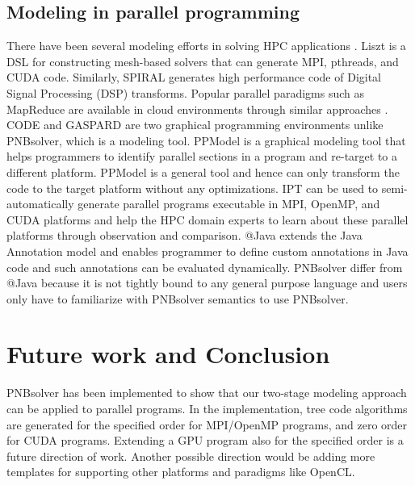 \documentclass[draftclsnofoot]{elsarticle}
\begin{document}
\subsection{Modeling in parallel programming}
There have been several modeling efforts in solving HPC applications \cite{rithu1,rithu2}. Liszt \cite{liszt} is a DSL for constructing mesh-based solvers that 
can generate MPI, pthreads, and CUDA code. Similarly, SPIRAL \cite{spiral} generates high performance code of Digital Signal Processing (DSP) transforms. 
Popular parallel paradigms such as MapReduce are available in cloud environments through similar approaches \cite{mapredoop}.
CODE \cite{code} and GASPARD \cite{gaspard} are two graphical programming environments unlike PNBsolver, which is a modeling tool. 
PPModel \cite{sc11,acmse} is a graphical modeling tool that helps programmers to identify parallel sections in a program and re-target to a different 
platform.  PPModel is a general tool and hence can only transform the code to the target platform without any optimizations.
IPT \cite{ipt} can be used to semi-automatically generate parallel programs executable in MPI, OpenMP, and CUDA platforms and help the HPC domain experts to learn about 
these parallel platforms through observation and comparison. @Java \cite{javaannotation} extends the Java Annotation model and enables programmer to define custom annotations in Java
code and such annotations can be evaluated dynamically. PNBsolver differ from @Java because it is not tightly bound to any general purpose language and users only have to familiarize with
PNBsolver semantics to use PNBsolver. 

\section{Future work and Conclusion}
\label{conclusion}

PNBsolver has been implemented to show that our two-stage modeling approach can be applied to parallel programs. In the implementation, tree code algorithms are generated
for the specified order for MPI/OpenMP programs, and zero order for CUDA programs. Extending a GPU program also for the specified order is a future direction of work.
Another possible direction would be adding more templates for supporting other platforms and paradigms like OpenCL.   
\end{document}
